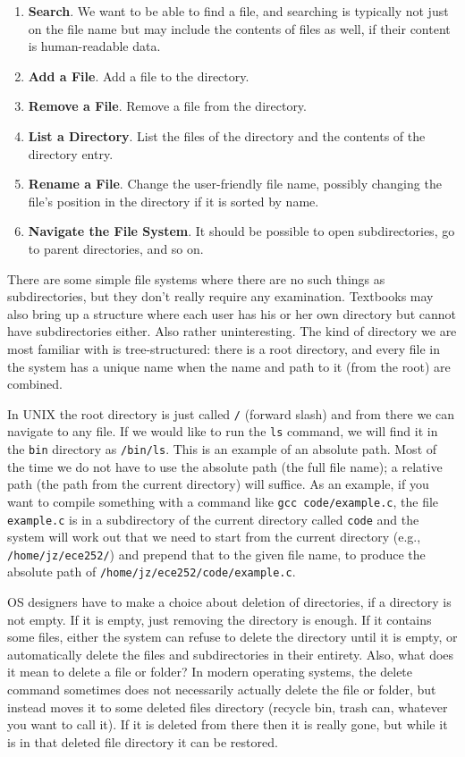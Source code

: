 \begin{enumerate}
	\item \textbf{Search}. We want to be able to find a file, and searching is typically not just on the file name but may include the contents of files as well, if their content is human-readable data.
	\item \textbf{Add a File}. Add a file to the directory.
	\item \textbf{Remove a File}. Remove a file from the directory.
	\item \textbf{List a Directory}. List the files of the directory and the contents of the directory entry.
	\item \textbf{Rename a File}. Change the user-friendly file name, possibly changing the file's position in the directory if it is sorted by name.
	\item \textbf{Navigate the File System}. It should be possible to open subdirectories, go to parent directories, and so on.
\end{enumerate}

There are some simple file systems where there are no such things as subdirectories, but they don't really require any examination. Textbooks may also bring up a structure where each user has his or her own directory but cannot have subdirectories either. Also rather uninteresting. The kind of directory we are most familiar with is tree-structured: there is a root directory, and every file in the system has a unique name when the name and path to it (from the root) are combined.

In UNIX the root directory is just called \texttt{/} (forward slash) and from there we can navigate to any file. If we would like to run the \texttt{ls} command, we will find it in the \texttt{bin} directory as \texttt{/bin/ls}. This is an example of an absolute path. Most of the time we do not have to use the absolute path (the full file name); a relative path (the path from the current directory) will suffice. As an example, if you want to compile something with a command like \texttt{gcc code/example.c}, the file \texttt{example.c} is in a subdirectory of the current directory called \texttt{code} and the system will work out that we need to start from the current directory (e.g., \texttt{/home/jz/ece252/}) and prepend that to the given file name, to produce the absolute path of \texttt{/home/jz/ece252/code/example.c}.

OS designers have to make a choice about deletion of directories, if a directory is not empty. If it is empty, just removing the directory is enough. If it contains some files, either the system can refuse to delete the directory until it is empty, or automatically delete the files and subdirectories in their entirety. Also, what does it mean to delete a file or folder? In modern operating systems, the delete command sometimes does not necessarily actually delete the file or folder, but instead moves it to some deleted files directory (recycle bin, trash can, whatever you want to call it). If it is deleted from there then it is really gone, but while it is in that deleted file directory it can be restored.

